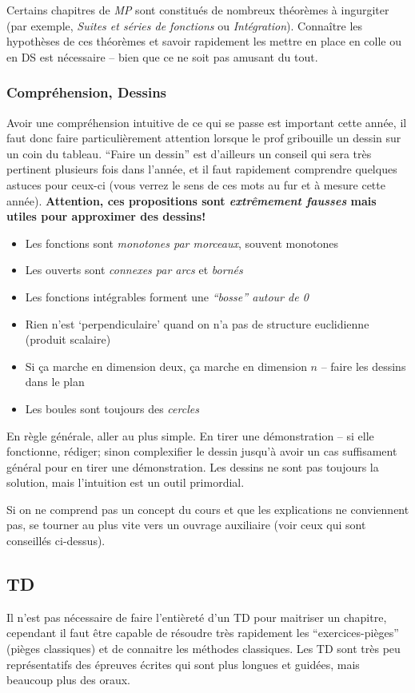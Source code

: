 \documentclass{article}
\begin{document}
Certains chapitres de \textit{MP} sont constitués de nombreux théorèmes à ingurgiter (par exemple, \textit{Suites et séries de fonctions} ou \textit{Intégration}).
Connaître les hypothèses de ces théorèmes et savoir rapidement les mettre en place en colle ou en DS est nécessaire -- bien que ce ne soit pas amusant du tout.

\subsubsection{Compréhension, Dessins}
Avoir une compréhension intuitive de ce qui se passe est important cette année, il faut donc faire particulièrement attention lorsque le prof gribouille un dessin sur un coin du tableau.
``Faire un dessin'' est d'ailleurs un conseil qui sera très pertinent plusieurs fois dans l'année, et il faut rapidement comprendre quelques astuces pour ceux-ci (vous verrez le sens de ces mots au fur et à mesure cette année).
\textbf{Attention, ces propositions sont \textit{extrêmement fausses} mais utiles pour approximer des dessins!}


\begin{itemize}
\item  Les fonctions sont \textit{monotones par morceaux}, souvent monotones
\item  Les ouverts sont \textit{connexes par arcs} et \textit{bornés}
\item  Les fonctions intégrables forment une \textit{``bosse'' autour de 0}
\item  Rien n'est `perpendiculaire' quand on n'a pas de structure euclidienne (produit scalaire)
\item  Si ça marche en dimension deux, ça marche en dimension $n$ -- faire les dessins dans le plan
\item  Les boules sont toujours des \textit{cercles}

\end{itemize}

En règle générale, aller au plus simple.
En tirer une démonstration -- si elle fonctionne, rédiger; sinon complexifier le dessin jusqu'à avoir un cas suffisament général pour en tirer une démonstration.
Les dessins ne sont pas toujours la solution, mais l'intuition est un outil primordial.

Si on ne comprend pas un concept du cours et que les explications ne conviennent pas, se tourner au plus vite vers un ouvrage auxiliaire (voir ceux qui sont conseillés ci-dessus).

\subsection{TD}
Il n'est pas nécessaire de faire l'entièreté d'un TD pour maitriser un chapitre, cependant il faut être capable de résoudre très rapidement les ``exercices-pièges'' (pièges classiques) et de connaitre les méthodes classiques.
Les TD sont très peu représentatifs des épreuves écrites qui sont plus longues et guidées, mais beaucoup plus des oraux.
\end{document}
